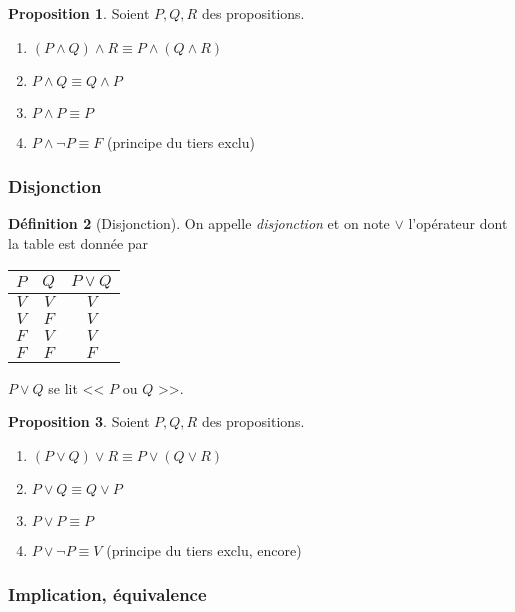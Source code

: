 \documentclass[11pt]{article}
\theoremstyle{definition}
\newtheorem{defn}{Définition}[section]
\newtheorem{prop}[defn]{Proposition}
\theoremstyle{remark}
\begin{document}
\begin{prop}
Soient $P,Q,R$ des propositions.
\begin{enumerate}
\item $(P\land Q)\land R \equiv P\land (Q\land R)$
\item $P\land Q \equiv Q\land P$
\item $P\land P\equiv P$
\item $P\land \neg P \equiv F$ (principe du tiers exclu)
\end{enumerate}

\end{prop}



\subsubsection{Disjonction}

\begin{defn}[Disjonction]
On appelle \textit{disjonction} et on note $\lor$ l'opérateur dont la table est donnée par
\begin{table}[ht]
\centering
\begin{tabular}{|c|c|c|}\hline
$P$ & $Q$ & $P\lor Q$ \\ \hline
$V$ & $V$ & $V$ \\\hline
$V$ & $F$ & $V$ \\\hline
$F$ & $V$ & $V$ \\\hline
$F$ & $F$ & $F$ \\\hline
\end{tabular}
\end{table}

$P\lor Q$ se lit << $P$ ou $Q$ >>.
\end{defn}

\begin{prop}
Soient $P,Q,R$ des propositions.
\begin{enumerate}
\item $(P\lor Q)\lor R \equiv P\lor (Q\lor R)$
\item $P\lor Q \equiv Q\lor P$
\item $P\lor P\equiv P$
\item $P\lor \neg P\equiv V$ (principe du tiers exclu, encore)
\end{enumerate}
\end{prop}



\subsubsection{Implication, équivalence}
\end{document}
